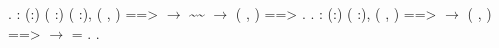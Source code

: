 \documentclass[12pt]{report}
\begin{document}
\begin{coqdoccode}
\coqdocnoindent
{}.\coqdoceol
\coqdocemptyline
\coqdocnoindent
{} : \coqdockw{\ensuremath{\forall}} (:) ( :) ( :), \coqdoceol
\coqdocindent{11.00em}
(    ,  ) ==>   \ensuremath{\rightarrow}  \~{}\~{}  \ensuremath{\rightarrow} (    ,  ) ==> .\coqdoceol
\coqdocnoindent
{}.\coqdoceol
\coqdocemptyline
\coqdocnoindent
{} : \coqdockw{\ensuremath{\forall}} (:) (  :),\coqdoceol
\coqdocindent{11.00em}
( , ) ==>  \ensuremath{\rightarrow} ( , ) ==>  \ensuremath{\rightarrow}  = .\coqdoceol
\coqdocnoindent
{}.\coqdoceol
\end{coqdoccode}
\end{document}
